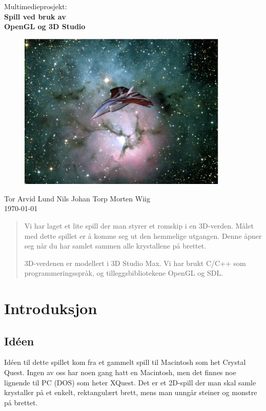 \documentclass[11pt, dvips]{report}
\begin{document}
\thispagestyle{empty}
\begin{center}
\LARGE{Multimedieprosjekt:\\
\bf Spill ved bruk av\\
OpenGL og 3D Studio}

\vspace{2em}
\begin{figure}[!h]
\center\includegraphics[width=10cm]{loading.eps}
\end{figure}
\vspace{2em}
\large{Tor Arvid Lund \qquad Nils Johan Torp \qquad Morten Wiig}\\[1em]
\today
\end{center}
\newpage

\begin{abstract}
Vi har laget et lite spill der man styrer et romskip i en 3D-verden.
Målet med dette spillet er å komme seg ut den hemmelige utgangen.
Denne åpner seg når du har samlet sammen alle krystallene på brettet.

3D-verdenen er modellert i 3D Studio Max. Vi har brukt C/C++ som
programmeringsspråk, og tilleggsbibliotekene OpenGL og SDL.
\end{abstract}

\tableofcontents

\chapter{Introduksjon} 

\section{Idéen}

Idéen til dette spillet kom fra et gammelt spill til Macintosh som het
Crystal Quest. Ingen av oss har noen gang hatt en Macintosh, men det
finnes noe lignende til PC (DOS) som heter XQuest. Det er et 2D-spill
der man skal samle krystaller på et enkelt, rektangulært brett, mens
man unngår steiner og monstre på brettet.
\end{document}
